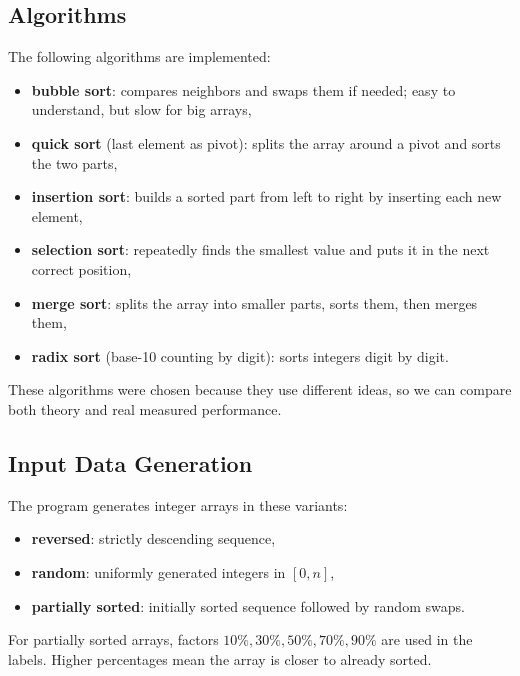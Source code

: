 \documentclass[11pt,a4paper]{article}
\begin{document}
\subsection{Algorithms}
The following algorithms are implemented:
\begin{itemize}
    \item \textbf{bubble sort}: compares neighbors and swaps them if needed; easy to understand, but slow for big arrays,
    \item \textbf{quick sort} (last element as pivot): splits the array around a pivot and sorts the two parts,
    \item \textbf{insertion sort}: builds a sorted part from left to right by inserting each new element,
    \item \textbf{selection sort}: repeatedly finds the smallest value and puts it in the next correct position,
    \item \textbf{merge sort}: splits the array into smaller parts, sorts them, then merges them,
    \item \textbf{radix sort} (base-10 counting by digit): sorts integers digit by digit.
\end{itemize}

These algorithms were chosen because they use different ideas, so we can compare both theory and real measured performance.

\subsection{Input Data Generation}
The program generates integer arrays in these variants:
\begin{itemize}
    \item \textbf{reversed}: strictly descending sequence,
    \item \textbf{random}: uniformly generated integers in \([0, n]\),
    \item \textbf{partially sorted}: initially sorted sequence followed by random swaps.
\end{itemize}

For partially sorted arrays, factors \(10\%, 30\%, 50\%, 70\%, 90\%\) are used in the labels. Higher percentages mean the array is closer to already sorted.
\end{document}
